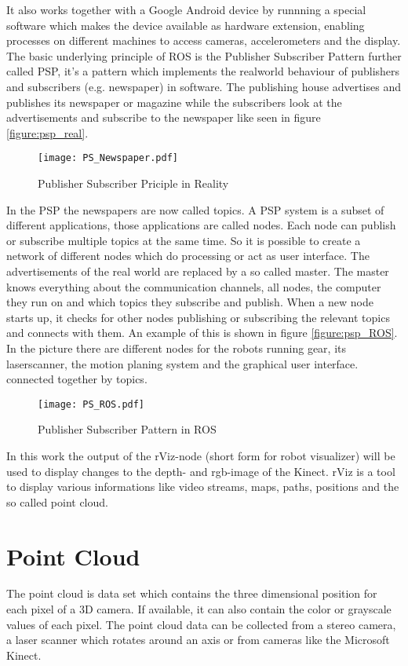 It also works together with a Google Android device by runnning a special software which makes the device available
as hardware extension, enabling processes on different machines to access cameras, accelerometers and the display.
The basic underlying principle of ROS is the Publisher Subscriber Pattern further called PSP, it's a pattern which 
implements the realworld behaviour of publishers and subscribers (e.g. newspaper) in software. 
The publishing house advertises and publishes its newspaper or magazine while the subscribers look at the advertisements
and subscribe to the newspaper like seen in figure \vref{figure:psp_real}.

\begin{figure}[htp]
	\centering
	\texttt{[image: PS\_Newspaper.pdf]}
	\caption{Publisher Subscriber Priciple in Reality}
	\label{figure:psp_real}
\end{figure} 


In the PSP the newspapers are now called topics. A PSP system is a subset of different applications, those applications are called nodes.  
Each node can publish or subscribe multiple topics at the same time. So it is possible to create a network of different nodes which
do processing or act as user interface. The advertisements of the real world are replaced by a so called master. 
The master knows everything about the communication channels, all nodes, the computer they run on and 
which topics they subscribe and publish. When a new node starts up, it checks for other nodes publishing or subscribing the relevant topics
and connects with them. An example of this is shown in figure \vref{figure:psp_ROS}.
In the picture there are different nodes for the robots running gear, its laserscanner, the motion planing system and the graphical user interface.
connected together by topics.

\begin{figure}[htp]
	\centering
	\texttt{[image: PS\_ROS.pdf]}
	\caption{Publisher Subscriber Pattern in ROS}
	\label{figure:psp_ROS}
\end{figure} 

In this work the output of the rViz-node (short form for robot visualizer) will be used to display changes to the depth- and 
rgb-image of the Kinect. rViz is a tool to display various informations like video streams, maps, paths, positions and the
so called point cloud.

\section{Point Cloud}
The point cloud is data set which contains the three dimensional position for each pixel of a 3D camera. 
If available, it can also contain the color or grayscale values of each pixel. 
The point cloud data can be collected from a stereo camera, a laser scanner which rotates around an axis or 
from cameras like the Microsoft Kinect.



